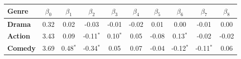 \begin{tabular}{|l|c|c|c|c|c|c|c|c|c|}
\hline
\textbf{Genre} &\textbf{$\beta_{0}$}&\textbf{$\beta_{1}$}&\textbf{$\beta_{2}$}&\textbf{$\beta_{3}$}&\textbf{$\beta_{4}$}&\textbf{$\beta_{5}$}&\textbf{$\beta_{6}$}&\textbf{$\beta_{7}$}&\textbf{$\beta_{8}$}\\\hline\hline
\textbf{Drama}&0.32&0.02&-0.03&-0.01&-0.02&0.01&0.00&-0.01&0.00\\\hline
\textbf{Action}&3.43&0.09&-0.11$^*$&0.10$^*$&0.05&-0.08&0.13$^*$&-0.02&-0.02\\\hline
\textbf{Comedy}&3.69&0.48$^*$&-0.34$^*$&0.05&0.07&-0.04&-0.12$^*$&-0.11$^*$&0.06\\\hline
\end{tabular}
